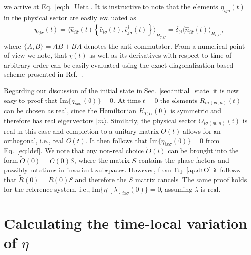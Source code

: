 \documentclass[twocolumn,prb,showpacs,aps,superscriptaddress]{revtex4}
\newcommand{\cd}[1]{\ensuremath{\hat{c}^\dagger_{#1}}}
\newcommand{\cc}[1]{\ensuremath{\hat{c}_{#1}}}
\newcommand{\rwf}[1]{\ensuremath{\vert #1 \rangle}}
\newcommand{\est}[1]{\ensuremath{\langle {#1} \rangle}}
\begin{document}
we arrive at Eq.\ \eqref{eq:h=Ueta}. It is instructive to note that the
elements $\eta_{ij\sigma}(t)$ in the physical sector are easily evaluated as
\begin{align}
  &\eta_{ij\sigma}(t) 
  = 
  \est{
    \hat{n}_{i\bar\sigma}(t)
    \left\{
      \cc{i\sigma}(t),
      \cd{j\sigma}(t)
    \right\}
  }_{H_{T, U}}
  =
  \delta_{ij}
  \est{
    \hat{n}_{i\bar\sigma} (t)
  }_{H_{T, U}},
\end{align}
where $\{ A, B \} = AB + BA$ denotes the anti-commutator.  From a numerical
point of view we note, that $\eta(t)$ as well as its derivatives with respect
to time of arbitrary order can be easily evaluated using the
exact-diagonalization-based scheme presented in Ref.\ .

Regarding our discussion of the initial state in Sec.\ \ref{sec:initial_state}
it is now easy to proof that $\mathrm{Im} \{ \eta_{ix\sigma}(0) \} = 0$. At
time $t=0$ the elements $R_{i\sigma(m,n)}(t)$ can be chosen as real, since the
Hamiltonian $H_{T,U}(0)$ is symmetric and therefore has real eigenvectors
$\rwf{m}$. Similarly, the physical sector $O_{i\sigma(m,n)}(t)$ is real in this
case and completion to a unitary matrix $O(t)$ allows for an orthogonal, i.e.,
real $O(t)$. It then follows that $\mathrm{Im} \{ \eta_{ix\sigma}(0) \} = 0$
from Eq.\ \eqref{eq:ldef}. We note that any non-real choice $\tilde O(t)$ can
be brought into the  form $\tilde O(0) = O(0)S$, where the matrix $S$ contains
the phase factors and possibly rotations in invariant subspaces. However, from
Eq.  \eqref{ap:dtO} it follows that $\tilde R(0) = R(0)S$ and therefore the $S$
matrix cancels. The same proof holds for the reference system, i.e.,
$\mathrm{Im}\{\eta'[\lambda]_{ix\sigma}(0)\} = 0$, assuming $\lambda$ is real.

\section{Calculating the time-local variation of $\eta$}
\label{ap:d_eta}
\end{document}
